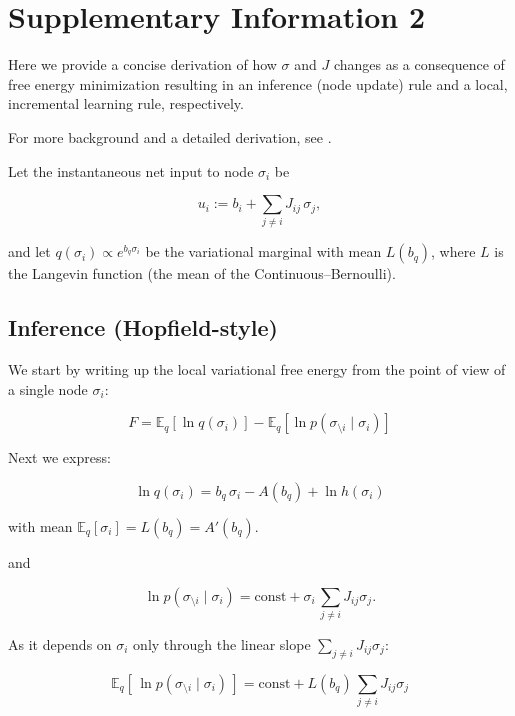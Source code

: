 \documentclass{article}
\begin{document}
\section{Supplementary Information 2}

Here we provide a concise derivation of how $\sigma$ and $J$ changes as a consequence of free energy minimization resulting in an inference (node update) rule and a local, incremental learning rule, respectively.

For more background and a detailed derivation, see \citep{https://doi.org/10.48550/arxiv.2505.22749}.

Let the instantaneous net input to node $\sigma_i$ be

\begin{equation}
u_i := b_i + \sum_{j\ne i} J_{ij}\,\sigma_j,
\end{equation}

and let $q(\sigma_i)\propto e^{b_q\sigma_i}$ be the variational marginal with mean $L(b_q)$, where $L$ is the Langevin function (the mean of the Continuous--Bernoulli).

\subsection{Inference (Hopfield-style)}

We start by writing up the local variational free energy from the point of view of a single node $\sigma_i$:

\begin{equation}
\label{variational-free-energy}
F = \mathbb{E}_q[\ln q(\sigma_i)] - \mathbb{E}_q[\ln p(\sigma_{\setminus i}\mid \sigma_i)]
\end{equation}

Next we express:

\begin{equation}
\ln q(\sigma_i)= b_q\,\sigma_i - A(b_q) + \ln h(\sigma_i)
\end{equation}

with mean $\mathbb{E}_q[\sigma_i]=L(b_q)=A'(b_q)$.

and

\begin{equation}
\ln p(\sigma_{\setminus i}\mid \sigma_i) = \text{const} + \sigma_i\,\sum_{j\ne i} J_{ij}\sigma_j.
\end{equation}

As it depends on $\sigma_i$ only through the linear slope $\sum_{j\ne i}J_{ij}\sigma_j$:

\begin{equation}
\mathbb{E}_q[\,\ln p(\sigma_{\setminus i}\mid \sigma_i)\,] = \text{const} + L(b_q)\,\sum_{j\ne i} J_{ij}\sigma_j
\end{equation}
\end{document}
